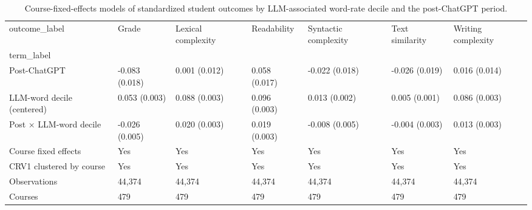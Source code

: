 \begin{table}
\caption{Course-fixed-effects models of standardized student outcomes by LLM-associated word-rate decile and the post-ChatGPT period.}
\label{tab:llm_decile_interactions_standardized}
\begin{tabular}{lllllll}
\toprule
outcome_label & Grade & Lexical complexity & Readability & Syntactic complexity & Text similarity & Writing complexity \\
term_label &  &  &  &  &  &  \\
\midrule
Post-ChatGPT & -0.083
(0.018) & 0.001
(0.012) & 0.058
(0.017) & -0.022
(0.018) & -0.026
(0.019) & 0.016
(0.014) \\
LLM-word decile (centered) & 0.053
(0.003) & 0.088
(0.003) & 0.096
(0.003) & 0.013
(0.002) & 0.005
(0.001) & 0.086
(0.003) \\
Post × LLM-word decile & -0.026
(0.005) & 0.020
(0.003) & 0.019
(0.003) & -0.008
(0.005) & -0.004
(0.003) & 0.013
(0.003) \\
Course fixed effects & Yes & Yes & Yes & Yes & Yes & Yes \\
CRV1 clustered by course & Yes & Yes & Yes & Yes & Yes & Yes \\
Observations & 44,374 & 44,374 & 44,374 & 44,374 & 44,374 & 44,374 \\
Courses & 479 & 479 & 479 & 479 & 479 & 479 \\
\bottomrule
\end{tabular}
\end{table}

